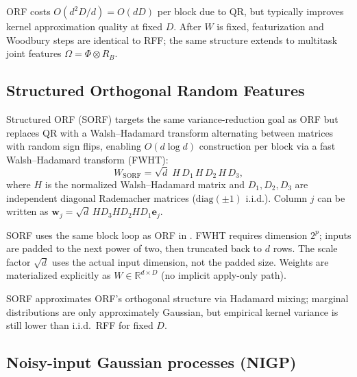 \documentclass[11pt]{article}
\newcommand{\Ph}{\Phi}
\newcommand{\Om}{\Omega}
\newcommand{\RB}{R_B}
\begin{document}
ORF costs $O(d^2 D/d) = O(dD)$ per block due to QR, but typically improves kernel approximation quality
at fixed $D$.
After $W$ is fixed, featurization and Woodbury steps are identical to RFF; the same structure extends to
multitask joint features $\Om = \Ph \otimes \RB$.

\subsection{Structured Orthogonal Random Features}
\label{sec:progress-sorf}

Structured ORF (SORF) \citep{yu2016orf} targets the same variance-reduction goal as ORF but replaces
QR with a Walsh--Hadamard transform alternating between matrices with random sign flips, enabling
$O(d \log d)$ construction per block via a fast Walsh--Hadamard transform (FWHT):
\begin{equation}
  \label{eq:progress-sorf}
  W_{\mathrm{SORF}} = \sqrt{d}\; H\, D_1\, H\, D_2\, H\, D_3,
\end{equation}
where $H$ is the normalized Walsh--Hadamard matrix and $D_1, D_2, D_3$ are independent diagonal
Rademacher matrices ($\mathrm{diag}(\pm 1)$ i.i.d.).
Column $j$ can be written as $\mathbf w_j = \sqrt{d}\, H D_3 H D_2 H D_1 \mathbf e_j$.

SORF uses the same block loop as ORF in .
FWHT requires dimension $2^p$; inputs are padded to the next power of two, then truncated back to $d$ rows.
The scale factor $\sqrt{d}$ uses the actual input dimension, not the padded size.
Weights are materialized explicitly as $W \in \mathbb{R}^{d \times D}$ (no implicit apply-only path).

SORF approximates ORF's orthogonal structure via Hadamard mixing; marginal distributions are only
approximately Gaussian, but empirical kernel variance is still lower than i.i.d.\ RFF for fixed $D$.

\subsection{Noisy-input Gaussian processes (NIGP)}
\label{sec:nigp}
\end{document}
